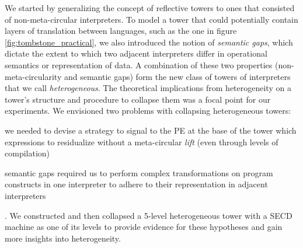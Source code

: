 \documentclass[sigplan,anonymous,review]{acmart}
\theoremstyle{definition}
\begin{document}

We started by generalizing the concept of reflective towers to ones that consisted of non-meta-circular interpreters. To model a tower that could potentially contain layers of translation between languages, such as the one in figure \ref{fig:tombstone_practical}, we also introduced the notion of \textit{semantic gaps}, which dictate the extent to which two adjacent interpreters differ in operational semantics or representation of data. A combination of these two properties (non-meta-circularity and semantic gaps) form the new class of towers of interpreters that we call \textit{heterogeneous}. The theoretical implications from heterogeneity on a tower's structure and procedure to collapse them was a focal point for our experiments. We envisioned two problems with collapsing heterogeneous towers:
\begin{enumerate*}[label=(\arabic*)]
    \item we needed to devise a strategy to signal to the PE at the base of the tower which expressions to residualize without a meta-circular \textit{lift} (even through levels of compilation)
    \item semantic gaps required us to perform complex transformations on program constructs in one interpreter to adhere to their representation in adjacent interpreters
\end{enumerate*}. We constructed and then collapsed a 5-level heterogeneous tower with a SECD machine as one of its levels to provide evidence for these hypotheses and gain more insights into heterogeneity.
\end{document}

